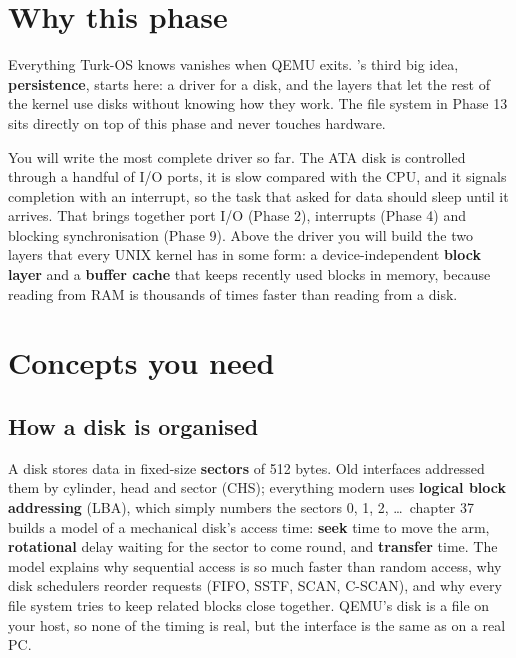 \documentclass[11pt,a4paper]{article}
\begin{document}


\section{Why this phase}

Everything Turk-OS knows vanishes when QEMU exits. \OSTEP's third big idea, \textbf{persistence}, starts here: a
driver for a disk, and the layers that let the rest of the kernel use disks without knowing how they work. The file
system in Phase 13 sits directly on top of this phase and never touches hardware.

You will write the most complete driver so far. The ATA disk is controlled through a handful of I/O ports, it is slow
compared with the CPU, and it signals completion with an interrupt, so the task that asked for data should sleep
until it arrives. That brings together port I/O (Phase 2), interrupts (Phase 4) and blocking synchronisation
(Phase 9). Above the driver you will build the two layers that every UNIX kernel has in some form: a
device-independent \textbf{block layer} and a \textbf{buffer cache} that keeps recently used blocks in memory, because
reading from RAM is thousands of times faster than reading from a disk.

\section{Concepts you need}

\subsection{How a disk is organised}

A disk stores data in fixed-size \textbf{sectors} of 512 bytes. Old interfaces addressed them by cylinder, head and
sector (CHS); everything modern uses \textbf{logical block addressing} (LBA), which simply numbers the sectors 0, 1,
2, \dots\ \OSTEP chapter 37 builds a model of a mechanical disk's access time: \textbf{seek} time to move the arm,
\textbf{rotational} delay waiting for the sector to come round, and \textbf{transfer} time. The model explains why
sequential access is so much faster than random access, why disk schedulers reorder requests (FIFO, SSTF, SCAN,
C-SCAN), and why every file system tries to keep related blocks close together. QEMU's disk is a file on your host,
so none of the timing is real, but the interface is the same as on a real PC.
\end{document}
